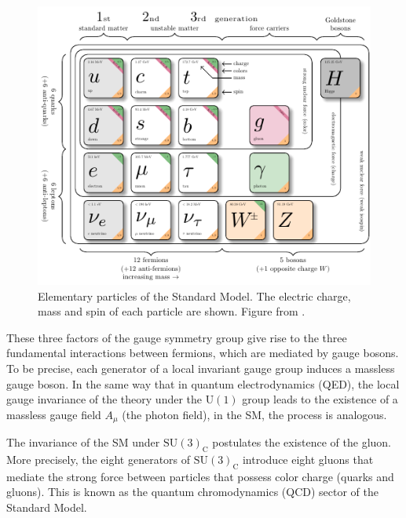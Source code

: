 \begin{figure}[!ht]
    \vspace*{-0.0cm}
    \centering
    \setlength{\mylength}{\textwidth}
    \includegraphics[width=0.84\mylength]{resources/SM_particles/SM_particles.pdf}
    \vspace*{-0.0cm}
    \caption{Elementary particles of the Standard Model. The electric charge, mass and spin of each particle are shown. Figure from \cite{Wongel:2816526}.}
    \label{fig:SM}
    \vspace*{-0.3cm}
\end{figure}
These three factors of the gauge symmetry group give rise to the three fundamental interactions between fermions, which are mediated by gauge bosons. To be precise, each generator of a local invariant gauge group induces a massless gauge boson. In the same way that in quantum electrodynamics (QED), the local gauge invariance of the theory under the $\text{U}(1)$ group leads to the existence of a massless gauge field $A_\mu$ (the photon field), in the SM, the process is analogous.

The invariance of the SM under $\text{SU}(3)_{\text{C}}$ postulates the existence of the gluon. More precisely, the eight generators of $\text{SU}(3)_{\text{C}}$ introduce eight gluons that mediate the strong force between particles that possess color charge (quarks and gluons). This is known as the quantum chromodynamics (QCD) sector of the Standard Model.

